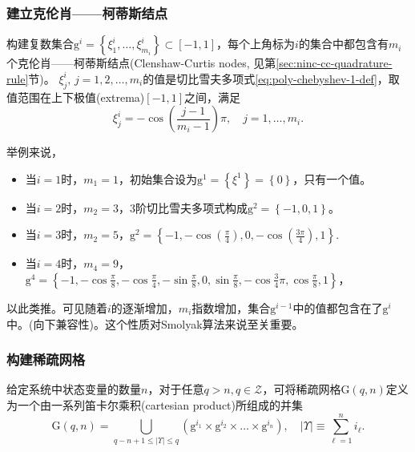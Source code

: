 \subsubsection{建立克伦肖——柯蒂斯结点}
\label{sec:pj-sparsity-steps-cc-nodes}
构建复数集合$\mathrm{g}^{i} = \left\{ \xi_{1}^{i}, \ldots, \xi_{m_i}^{i} \right\} \subset \left[ -1 , 1 \right]$，每个上角标为$i$的集合中都包含有$m_{i}$个克伦肖——柯蒂斯结点(Clenshaw-Curtis nodes, 见第\ref{sec:ninc-cc-quadrature-rule}节)。
$\xi_{j}^{i}, \, j=1,2,\ldots, m_{i}$的值是切比雪夫多项式\eqref{eq:poly-chebyshev-1-def}，取值范围在上下极值(extrema)$\left[ -1, 1 \right]$之间，满足
  \begin{equation}
    \label{eq:pj-sparsity-cc-nodes}
    \xi_{j}^{i} = - \cos \left( \frac{j - 1}{m_{i}-1}\right) \pi, \quad j = 1,\ldots,m_{i}.
  \end{equation}

  举例来说，\begin{itemize}
  \item 当$i=1$时，$m_{1}=1$，初始集合设为$\mathrm{g}^{1} = \left\{ \xi^{1} \right\} = \left\{ 0 \right\}$，只有一个值。
  \item 当$i=2$时，$m_{2} = 3$，3阶切比雪夫多项式构成$\mathrm{g}^{2} = \left\{ -1, 0, 1 \right\}$。
  \item 当$i=3$时，$m_{2} = 5$，$\mathrm{g}^{2} = \left\{ -1, - \cos \left( \frac{\pi}{4} \right), 0, - \cos \left( \frac{3 \pi}{4} \right), 1 \right\}.$
  \item 当$i=4$时，$m_{4} = 9$，$\mathrm{g}^{4} = \left\{ -1, -\cos \frac{\pi}{8}, -\cos \frac{\pi}{4}, -\sin \frac{\pi}{8}, 0, \sin \frac{\pi}{8}, - \cos \frac{3}{4} \pi, \cos \frac{\pi}{8}, 1 \right\}$，
\end{itemize}
以此类推。可见随着$i$的逐渐增加，$m_{i}$指数增加，集合$\mathrm{g}^{i-1}$中的值都包含在了$\mathrm{g}^{i}$中。(向下兼容性)。这个性质对Smolyak算法来说至关重要。

\subsubsection{构建稀疏网格}
\label{sec:pj-sparsity-steps-sparse-grid}
给定系统中状态变量的数量$n$，对于任意$q > n, q \in \mathcal{Z}$，可将稀疏网格$\mathrm{G} \left( q,n \right)$定义为一个由一系列笛卡尔乘积(cartesian product)所组成的并集
\begin{equation*}
  \mathrm{G} \left( q,n \right) = \bigcup_{q-n+1 \le \left| \Upsilon \right| \le q} \left( \mathrm{g}^{i_1} \times \mathrm{g}^{i_2} \times \ldots \times \mathrm{g}^{i_n}\right), \quad \left| \Upsilon \right| \equiv \sum_{\ell=1}^{n} i_{\ell}.
\end{equation*}

